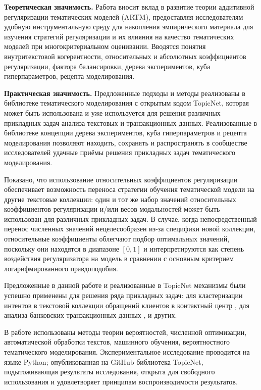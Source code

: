 \textbf{Теоретическая значимость.} 
Работа вносит вклад в развитие теории аддитивной регуляризации тематических моделей (ARTM), предоставляя исследователям удобную инструментальную среду для накопления эмпирического материала для изучения стратегий регуляризации и их влияния на качество тематических моделей при многокритериальном оценивании. Вводятся понятия внутритекстовой когерентности, относительных и абсолютных коэффициентов регуляризации, фактора балансировки, дерева экспериментов, куба гиперпараметров, рецепта моделирования.

\textbf{Практическая значимость.} 
Предложенные подходы и методы реализованы в библиотеке тематического моделирования с открытым кодом TopicNet, которая может быть использована и уже используется для решения различных прикладных задач анализа текстовых и транзакционных данных. Реализованные в библиотеке концепции дерева экспериментов, куба гиперпараметров и рецепта моделирования позволяют находить, сохранять и распространять в сообществе исследователей удачные приёмы решения прикладных задач тематического моделирования.

Показано, что использование относительных коэффициентов регуляризации обеспечивает возможность переноса стратегии обучения тематической модели на другие текстовые коллекции: один и тот же набор значений относительных коэффициентов регуляризации и/или весов модальностей может быть использован для различных прикладных задач. В случае, когда непосредственный перенос численных значений нецелесообразен из-за специфики новой коллекции, относительные коэффициенты облегчают подбор оптимальных значений, поскольку они находятся в диапазоне $[0, 1]$ и интерпретируются как степень воздействия регуляризатора на модель в сравнении с основным критерием логарифмированного правдоподобия.

Предложенные в данной работе и реализованные в TopicNet механизмы были успешно применены для решения ряда прикладных задач: 
для кластеризации интентов в текстовой коллекции обращений клиентов в контактный центр \cite{popov_hier}, 
для анализа банковских транзакционных данных \cite{egorov2019topic}, и других.

{\methods} В работе использованы методы теории вероятностей, численной оптимизации, автоматической обработки текстов, машинного обучения, вероятностного тематического моделирования. Экспериментальное исследование проводится на языке Python; опубликованная на GitHub библиотека TopicNet, подытоживающая результаты исследования, открыта для свободного использования и удовлетворяет принципам воспроизводимости результатов.

